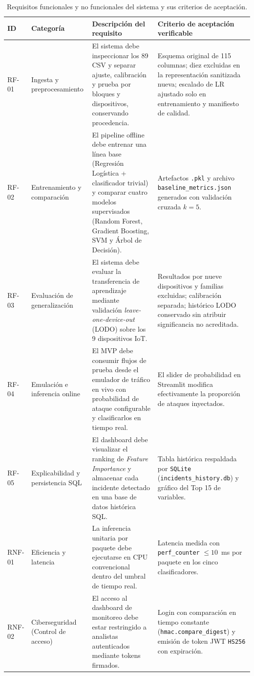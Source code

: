 \documentclass[11pt,a4paper]{article}
\begin{document}
\begin{table}[H]
\centering
\caption{Requisitos funcionales y no funcionales del sistema y sus criterios de aceptación.}
\label{tab:requisitos}
\footnotesize
\begin{tabularx}{\textwidth}{p{1.2cm} p{2.2cm} X p{4.2cm}}
\toprule
\textbf{ID} & \textbf{Categoría} & \textbf{Descripción del requisito} & \textbf{Criterio de aceptación verificable} \\
\midrule
RF-01 & Ingesta y preprocesamiento & El sistema debe inspeccionar los 89 CSV y separar ajuste, calibración y prueba por bloques y dispositivos, conservando procedencia. & Esquema original de 115 columnas; diez excluidas en la representación sanitizada nueva; escalado de LR ajustado solo en entrenamiento y manifiesto de calidad. \\
RF-02 & Entrenamiento y comparación & El pipeline offline debe entrenar una línea base (Regresión Logística + clasificador trivial) y comparar cuatro modelos supervisados (Random Forest, Gradient Boosting, SVM y Árbol de Decisión). & Artefactos \texttt{.pkl} y archivo \texttt{baseline\_metrics.json} generados con validación cruzada $k=5$. \\
RF-03 & Evaluación de generalización & El sistema debe evaluar la transferencia de aprendizaje mediante validación \textit{leave-one-device-out} (LODO) sobre los 9 dispositivos IoT. & Resultados por nueve dispositivos y familias excluidas; calibración separada; histórico LODO conservado sin atribuir significancia no acreditada. \\
RF-04 & Emulación e inferencia online & El MVP debe consumir flujos de prueba desde el emulador de tráfico en vivo con probabilidad de ataque configurable y clasificarlos en tiempo real. & El slider de probabilidad en Streamlit modifica efectivamente la proporción de ataques inyectados. \\
RF-05 & Explicabilidad y persistencia SQL & El dashboard debe visualizar el ranking de \textit{Feature Importance} y almacenar cada incidente detectado en una base de datos histórica SQL. & Tabla histórica respaldada por \texttt{SQLite} (\texttt{incidents\_history.db}) y gráfico del Top 15 de variables. \\
\midrule
RNF-01 & Eficiencia y latencia & La inferencia unitaria por paquete debe ejecutarse en CPU convencional dentro del umbral de tiempo real. & Latencia medida con \texttt{perf\_counter} $\leq 10$~ms por paquete en los cinco clasificadores. \\
RNF-02 & Ciberseguridad (Control de acceso) & El acceso al dashboard de monitoreo debe estar restringido a analistas autenticados mediante tokens firmados. & Login con comparación en tiempo constante (\texttt{hmac.compare\_digest}) y emisión de token JWT \texttt{HS256} con expiración. \\

\end{tabularx}
\end{table}
\end{document}
